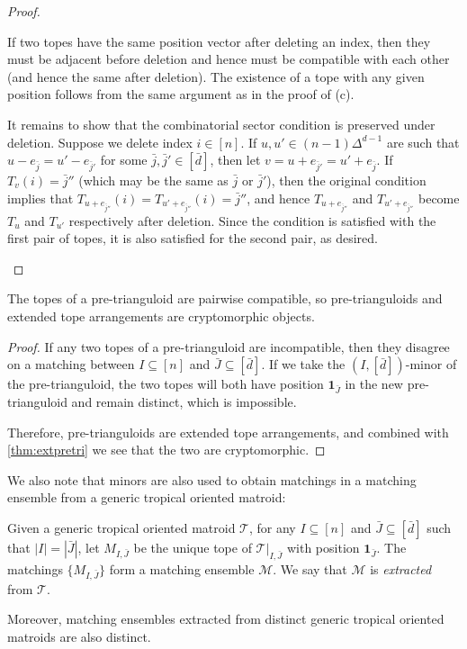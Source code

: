 \documentclass[letterpaper,reqno,11pt]{amsart}
\begin{document}
\begin{proof}
\begin{enumerate}
    If two topes have the same position vector after deleting an index, then they must be adjacent before deletion and hence must be compatible with each other (and hence the same after deletion). The existence of a tope with any given position follows from the same argument as in the proof of (c). 
    
    It remains to show that the combinatorial sector condition is preserved under deletion. Suppose we delete index $i\in [n]$. If $u, u'\in (n-1)\Delta^{d-1}$ are such that $u - e_{\bar{j}} = u' - e_{\bar{j}'}$ for some $\bar{j}, \bar{j}'\in [\bar{d}]$, then let $v = u + e_{\bar{j}'} = u' + e_{\bar{j}}$. If $T_v(i) = \bar{j}''$ (which may be the same as $\bar{j}$ or $\bar{j}'$), then the original condition implies that $T_{u + e_{\bar{j}''}}(i) = T_{u' + e_{\bar{j}''}}(i) = \bar{j}''$, and hence $T_{u + e_{\bar{j}''}}$ and $T_{u' + e_{\bar{j}''}}$ become $T_u$ and $T_{u'}$ respectively after deletion. Since the condition is satisfied with the first pair of topes, it is also satisfied for the second pair, as desired.

\end{enumerate}
\end{proof}

\begin{corollary}\label{cor:pretriext}
    The topes of a pre-trianguloid are pairwise compatible, so pre-trianguloids and extended tope arrangements are cryptomorphic objects.
\end{corollary}

\begin{proof}
    If any two topes of a pre-trianguloid are incompatible, then they disagree on a matching between $I\subseteq [n]$ and $\bar{J}\subseteq [\bar{d}]$. If we take the $(I, [\bar{d}])$-minor of the pre-trianguloid, the two topes will both have position $\mathbf{1}_{\bar{J}}$ in the new pre-trianguloid and remain distinct, which is impossible.

    Therefore, pre-trianguloids are extended tope arrangements, and combined with \cref{thm:extpretri} we see that the two are cryptomorphic.
\end{proof}

We also note that minors are also used to obtain matchings in a matching ensemble from a generic tropical oriented matroid:

\begin{proposition}\label{prop:extraction}
    Given a generic tropical oriented matroid $\mathcal{T}$, for any $I\subseteq [n]$ and $\bar{J}\subseteq [\bar{d}]$ such that $|I| = |\bar{J}|$, let $M_{I, \bar{J}}$ be the unique tope of $\mathcal{T}|_{I, \bar{J}}$ with position $\mathbf{1}_{\bar{J}}$. The matchings $\{M_{I, \bar{J}}\}$ form a matching ensemble $\mathcal{M}$. We say that $\mathcal{M}$ is \emph{extracted} from $\mathcal{T}$.

    Moreover, matching ensembles extracted from distinct generic tropical oriented matroids are also distinct.
\end{proposition}
\end{document}
